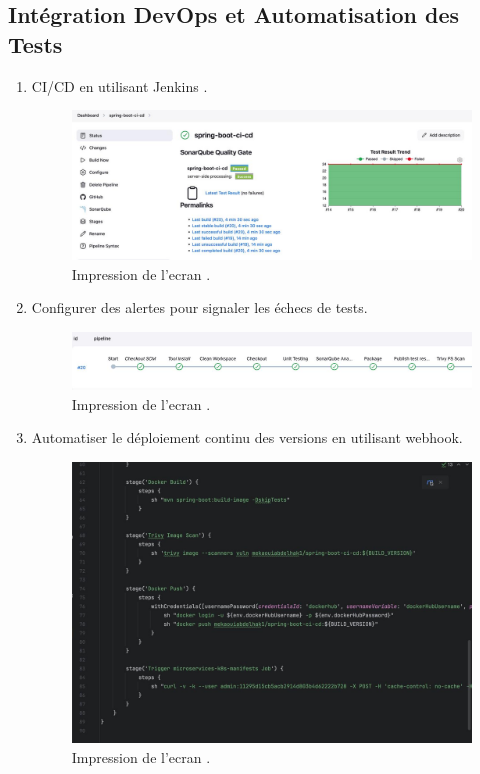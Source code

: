 \documentclass{article}
\begin{document}
\subsection{Intégration DevOps et Automatisation des Tests}

\begin{enumerate}
    \item CI/CD en utilisant Jenkins .
      \begin{figure}[H]
    \centering
    \includegraphics[width=1\linewidth]{assets/IMG-20241214-WA0006.jpg}
    \caption{\label{fig:frog14} Impression de l'ecran .}
    \end{figure}
    \item Configurer des alertes pour signaler les échecs de tests.
      \begin{figure}[H]
    \centering
    \includegraphics[width=1\linewidth]{assets/IMG-20241214-WA0002.jpg}
    \caption{\label{fig:frog15} Impression de l'ecran .}
    \end{figure}
    \item Automatiser le déploiement continu des versions en utilisant webhook.
      \begin{figure}[H]
    \centering
    \includegraphics[width=1\linewidth]{assets/IMG-20241214-WA0009.jpg}
    \caption{\label{fig:frog16} Impression de l'ecran .}
    \end{figure}
\end{enumerate}
\end{document}

